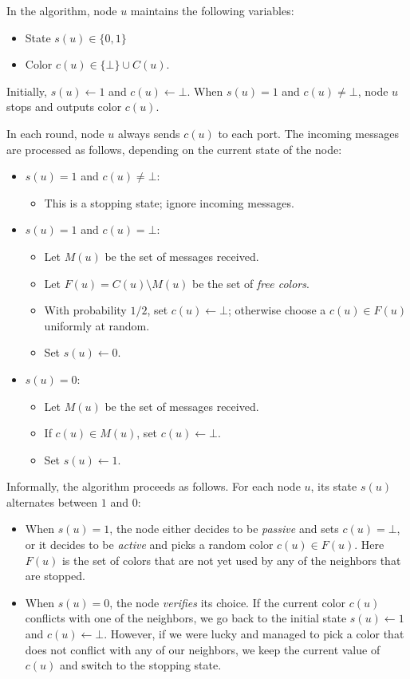 In the algorithm, node $u$ maintains the following variables:
\begin{itemize}[noitemsep]
    \item State $s(u) \in \{0,1\}$
    \item Color $c(u) \in \{\bot\} \cup C(u)$.
\end{itemize}
Initially, $s(u) \gets 1$ and $c(u) \gets \bot$. When $s(u) = 1$ and $c(u) \ne \bot$, node $u$ stops and outputs color $c(u)$.

In each round, node $u$ always sends $c(u)$ to each port. The incoming messages are processed as follows, depending on the current state of the node:
\begin{itemize}
    \item $s(u) = 1$ and $c(u) \ne \bot$:
    \begin{itemize}
        \item This is a stopping state; ignore incoming messages.
    \end{itemize}
    \item $s(u) = 1$ and $c(u) = \bot$:
    \begin{itemize}
        \item Let $M(u)$ be the set of messages received.
        \item Let $F(u) = C(u) \setminus M(u)$ be the set of \emph{free colors}.
        \item With probability $1/2$, set $c(u) \gets \bot$; otherwise choose a $c(u) \in F(u)$ uniformly at random.
        \item Set $s(u) \gets 0$.
    \end{itemize}
    \item $s(u) = 0$:
    \begin{itemize}
        \item Let $M(u)$ be the set of messages received.
        \item If $c(u) \in M(u)$, set $c(u) \gets \bot$.
        \item Set $s(u) \gets 1$.
    \end{itemize}
\end{itemize}

Informally, the algorithm proceeds as follows. For each node $u$, its state $s(u)$ alternates between $1$ and $0$:
\begin{itemize}
    \item When $s(u) = 1$, the node either decides to be \emph{passive} and sets $c(u) = \bot$, or it decides to be \emph{active} and picks a random color $c(u) \in F(u)$. Here $F(u)$ is the set of colors that are not yet used by any of the neighbors that are stopped.
    \item When $s(u) = 0$, the node \emph{verifies} its choice. If the current color $c(u)$ conflicts with one of the neighbors, we go back to the initial state $s(u) \gets 1$ and $c(u) \gets \bot$. However, if we were lucky and managed to pick a color that does not conflict with any of our neighbors, we keep the current value of $c(u)$ and switch to the stopping state.
\end{itemize}


